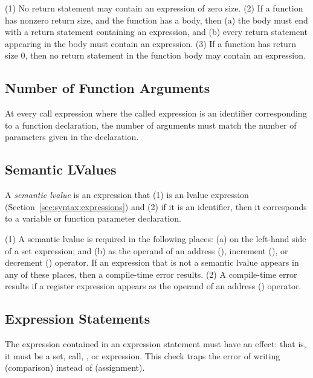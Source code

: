 \documentclass[10pt]{article}
\begin{document}
 (1) No return statement may contain an
expression of zero size.  (2) If a function has nonzero return size,
and the function has a body, then (a) the body must end with a return
statement containing an expression, and (b) every return statement
appearing in the body must contain an expression.  (3) If a function
has return size 0, then no return statement in the function body may
contain an expression.



\subsection{Number of Function Arguments}
\label{sec:semantics:fn-args}

At every call expression where the called expression is an identifier
corresponding to a function declaration, the number of arguments must
match the number of parameters given in the declaration.

\subsection{Semantic LValues}
\label{sec:semantics:lvalues}

  A \emph{semantic lvalue} is
an expression that (1) is an lvalue expression
(Section~\ref{sec:syntax:expressions}) and (2) if it is an identifier,
then it corresponds to a variable or function parameter declaration.

  (1) A semantic lvalue is
required in the following places: (a) on the left-hand side of a set
expression; and (b) as the operand of an address (), increment
(), or decrement () operator.  If an expression
that is not a semantic lvalue appears in any of these places, then a
compile-time error results.  (2) A compile-time error results if a
register expression appears as the operand of an address ()
operator.


\subsection{Expression Statements}
\label{sec:semantics:expr-stmts}

The expression contained in an expression statement must have an
effect: that is, it must be a set, call, , or 
expression.  This check traps the error of writing 
(comparison) instead of  (assignment).
\end{document}
